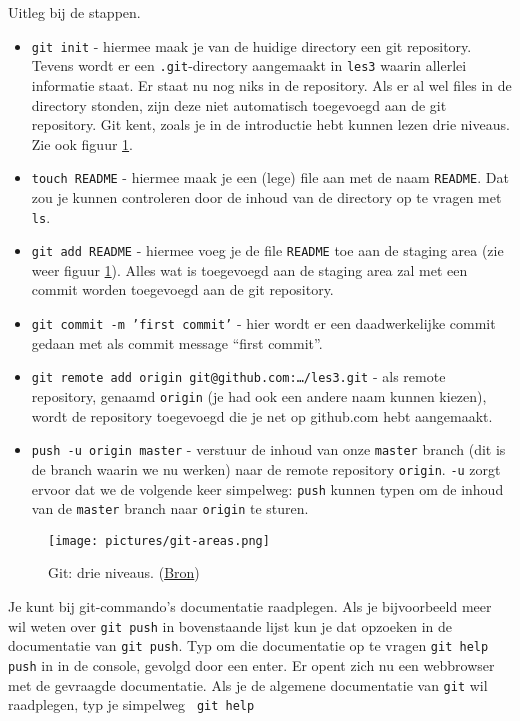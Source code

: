 Uitleg bij de stappen.
\begin{itemize}
  \item {\tt git init} - hiermee maak je van de huidige directory een
    git repository. Tevens wordt er een {\tt .git}-directory
    aangemaakt in {\tt les3} waarin allerlei informatie staat. 
    Er staat nu nog niks in de repository. Als er
    al wel files in de directory stonden, zijn deze niet automatisch
    toegevoegd aan de git repository. Git kent, zoals je in de
    introductie hebt kunnen lezen drie niveaus. Zie ook figuur \ref{fig:github-areas}.
    \item {\tt touch README} - hiermee maak je een (lege) file aan met
      de naam {\tt README}. Dat zou je kunnen controleren door de
      inhoud van de directory op te vragen met {\tt ls}.
    \item {\tt git add README} - hiermee voeg je de file {\tt README}
      toe aan de staging area (zie weer figuur
      \ref{fig:github-areas}). Alles wat is toegevoegd aan de staging
      area zal met een commit worden toegevoegd aan de git repository.
    \item {\tt git commit -m 'first commit'} - hier wordt er een
      daadwerkelijke commit gedaan met als commit message ``first 
      commit''.
      \item {\tt git remote add origin git@github.com:\ldots/les3.git}
        - als remote repository, genaamd {\tt origin} (je had ook een andere
        naam kunnen kiezen), wordt de repository toegevoegd die je net
        op github.com hebt aangemaakt.
      \item {\tt push -u origin master} - verstuur de inhoud van onze
        {\tt master} branch (dit is de branch waarin we nu werken)
        naar de remote repository {\tt origin}. {\tt -u} zorgt ervoor
        dat we de volgende keer simpelweg: {\tt push} kunnen typen om
        de inhoud van de {\tt master} branch naar {\tt origin} te sturen.
\end{itemize}

\begin{figure} 
\begin{center}
  \caption{Git: drie niveaus. (\href{http://progit.org/book/ch1-3.html}{Bron})}
  \texttt{[image: pictures/git-areas.png]}
  \label{fig:github-areas}
\end{center}
\end{figure}

\step Je kunt bij git-commando's documentatie raadplegen. Als je
bijvoorbeeld meer wil weten over {\tt git push} in bovenstaande lijst
kun je dat opzoeken in de documentatie van {\tt git push}. 
Typ om die documentatie op te vragen
{\tt git help push} in in de console, gevolgd door een enter. Er opent
zich nu een webbrowser met de gevraagde documentatie. Als je de
algemene documentatie van {\tt git} wil raadplegen, typ je simpelweg {\tt
  git help} \\

